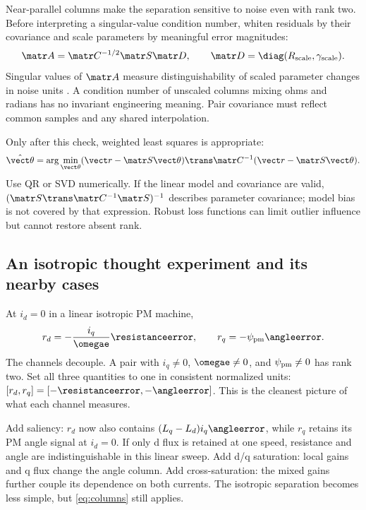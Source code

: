 Near-parallel columns make the separation sensitive to noise even with rank
two. Before interpreting a singular-value condition number, whiten residuals
by their covariance and scale parameters by meaningful error magnitudes:
\begin{equation}
 \matr A=\matr C^{-1/2}\matr S\matr D,\qquad
 \matr D=\diag(R_{\rm scale},\gamma_{\rm scale}).
\end{equation}
Singular values of $\matr A$ measure distinguishability of scaled parameter
changes in noise units \cite{horn2013}. A condition number of unscaled columns
mixing ohms and radians has no invariant engineering meaning. Pair covariance
must reflect common samples and any shared interpolation.

Only after this check, weighted least squares is appropriate:
\begin{equation}
 \hat{\vect\theta}=\arg\min_{\vect\theta}
 (\vect r-\matr S\vect\theta)\trans\matr C^{-1}
 (\vect r-\matr S\vect\theta).\label{eq:least-squares}
\end{equation}
Use QR or SVD numerically. If the linear model and covariance are valid,
$(\matr S\trans\matr C^{-1}\matr S)^{-1}$ describes parameter covariance;
model bias is not covered by that expression. Robust loss functions can limit
outlier influence but cannot restore absent rank.

\subsection{An isotropic thought experiment and its nearby cases}
At $i_d=0$ in a linear isotropic PM machine,
\begin{equation}
 r_d=-\frac{i_q}{\omegae}\resistanceerror,\qquad
 r_q=-\psi_{\rm pm}\angleerror.\label{eq:isotropic}
\end{equation}
The channels decouple. A pair with $i_q\ne0$, $\omegae\ne0$, and
$\psi_{\rm pm}\ne0$ has rank two. Set all three quantities to one in
consistent normalized units: $[r_d,r_q]=[-\resistanceerror,-\angleerror]$. This is the
cleanest picture of what each channel measures.

Add saliency: $r_d$ now also contains $(L_q-L_d)i_q\angleerror$, while $r_q$
retains its PM angle signal at $i_d=0$. If only d flux is retained at one speed,
resistance and angle are indistinguishable in this linear sweep. Add d/q
saturation: local gains and q flux change the angle column. Add cross-saturation:
the mixed gains further couple its dependence on both currents. The isotropic
separation becomes less simple, but \cref{eq:columns} still applies.

